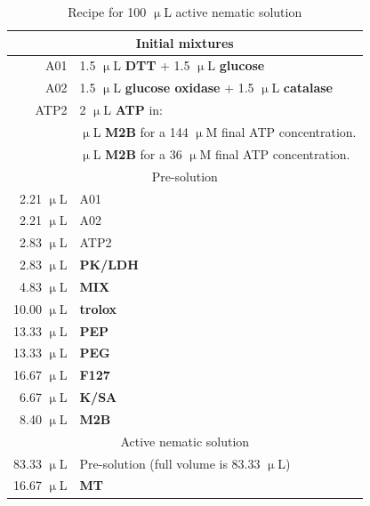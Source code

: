 \begin{table}[ht]
  \centering
  \caption{Recipe for 100 $\upmu$L active nematic solution}
  \begin{tabular}{|r l|}
    \hline
    \multicolumn{2}{|c|}{Initial mixtures}\\
    \hline
    A01 & 1.5 $\upmu$L {\bf DTT} + 1.5 $\upmu$L {\bf glucose} \\
    A02 & 1.5 $\upmu$L {\bf glucose oxidase} + 1.5 $\upmu$L {\bf catalase} \\
    ATP2 & 2 $\upmu$L {\bf ATP} in:\\
    & \quad 18 $\upmu$L {\bf M2B} for a 144 $\upmu$M final ATP concentration.\\
    & \quad 38 $\upmu$L {\bf M2B} for a 36 $\upmu$M final ATP concentration.\\
    \hline
    \multicolumn{2}{|c|}{Pre-solution}\\
    \hline
    2.21 $\upmu$L & A01\\
    2.21 $\upmu$L & A02\\
    2.83 $\upmu$L & ATP2\\
    2.83 $\upmu$L & {\bf PK/LDH} \\
    4.83 $\upmu$L & {\bf MIX}\\
    10.00 $\upmu$L & {\bf trolox}\\
    13.33 $\upmu$L & {\bf PEP}\\
    13.33 $\upmu$L & {\bf PEG}\\
    16.67 $\upmu$L & {\bf F127}\\
    6.67 $\upmu$L & {\bf K/SA}\\
    8.40 $\upmu$L & {\bf M2B}\\
    \hline
    \multicolumn{2}{|c|}{Active nematic solution}\\
    \hline
    83.33 $\upmu$L & Pre-solution (full volume is 83.33 $\upmu$L)\\
    16.67 $\upmu$L & {\bf MT}\\
    \hline
  \end{tabular}
  \label{t:3-recipe}
\end{table}


